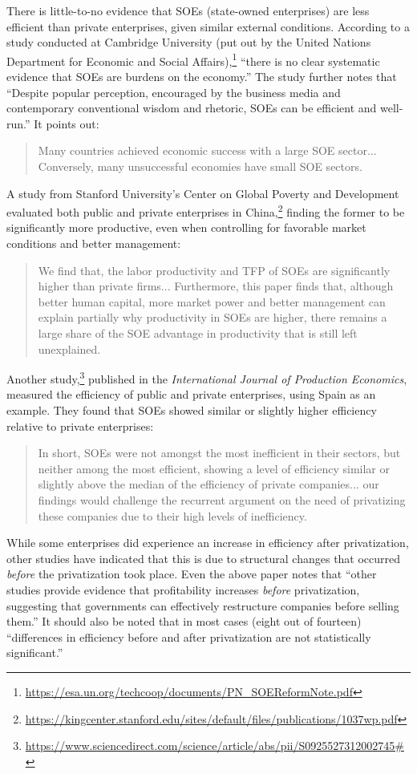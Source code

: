 There is little-to-no evidence that SOEs (state-owned enterprises) are less efficient than private enterprises, given similar external conditions.
According to a study conducted at Cambridge University (put out by the United Nations Department for Economic and Social Affairs),\footnote{\href{https://esa.un.org/techcoop/documents/PN_SOEReformNote.pdf}{https://esa.un.org/techcoop/documents/PN\_SOEReformNote.pdf}} ``there is no clear systematic evidence that SOEs are burdens on the economy.''
The study further notes that ``Despite popular perception, encouraged by the business media and contemporary conventional wisdom and rhetoric, SOEs can be efficient and well-run.''
It points out:
\begin{quote}
Many countries achieved economic success with a large SOE sector... Conversely, many unsuccessful economies have small SOE sectors.
\end{quote}
A study from Stanford University's Center on Global Poverty and Development evaluated both public and private enterprises in China,\footnote{\href{https://kingcenter.stanford.edu/sites/default/files/publications/1037wp.pdf}{https://kingcenter.stanford.edu/sites/default/files/publications/1037wp.pdf}} finding the former to be significantly more productive, even when controlling for favorable market conditions and better management:
\begin{quote}
We find that, the labor productivity and TFP of SOEs are significantly higher than private firms... Furthermore, this paper finds that, although better human capital, more market power and better management can explain partially why productivity in SOEs are higher, there remains a large share of the SOE advantage in productivity that is still left unexplained.
\end{quote}
Another study,\footnote{\href{https://www.sciencedirect.com/science/article/abs/pii/S0925527312002745\#}{https://www.sciencedirect.com/science/article/abs/pii/S0925527312002745\#}} published in the \textit{International Journal of Production Economics}, measured the efficiency of public and private enterprises, using Spain as an example.
They found that SOEs showed similar or slightly higher efficiency relative to private enterprises:
\begin{quote}
In short, SOEs were not amongst the most inefficient in their sectors, but neither among the most efficient, showing a level of efficiency similar or slightly above the median of the efficiency of private companies... our findings would challenge the recurrent argument on the need of privatizing these companies due to their high levels of inefficiency.
\end{quote}
While some enterprises did experience an increase in efficiency after privatization, other studies have indicated that this is due to structural changes that occurred \emph{before} the privatization took place.
Even the above paper notes that ``other studies provide evidence that profitability increases \emph{before} privatization, suggesting that governments can effectively restructure companies before selling them.''
It should also be noted that in most cases (eight out of fourteen) ``differences in efficiency before and after privatization are not statistically significant.''

